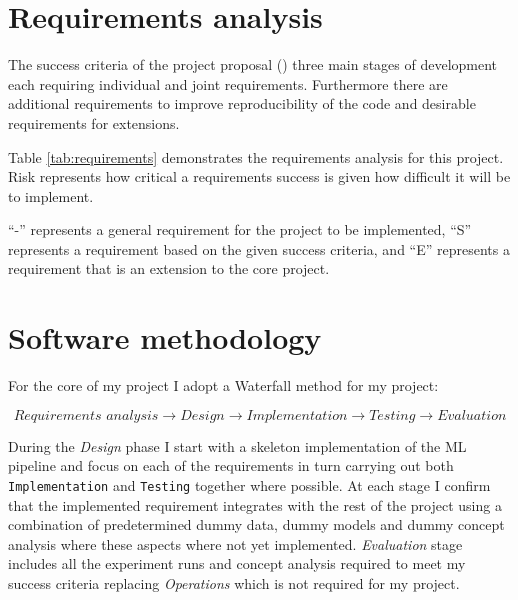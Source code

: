 \section{Requirements analysis}


The success criteria of the project proposal () three main stages of development each requiring individual and joint requirements.
Furthermore there are additional requirements to improve reproducibility of the code and desirable requirements for extensions.

Table \ref{tab:requirements} demonstrates the requirements analysis for this project.
Risk represents how critical a requirements success is given how difficult it will be to implement.

``-'' represents a general requirement for the project to be implemented, ``S'' represents a requirement based on the given success criteria, and ``E'' represents a requirement that is an extension to the core project.



\section{Software methodology}


For the core of my project I adopt a Waterfall method \cite{royce1970managing} for my project:

\begin{equation*}
    \textit{Requirements analysis} \longrightarrow \textit{Design} \longrightarrow \textit{Implementation} \longrightarrow \textit{Testing} \longrightarrow \textit{Evaluation}
\end{equation*}

During the \textit{Design} phase I start with a skeleton implementation of the ML pipeline and focus on each of the requirements in turn carrying out both \texttt{Implementation} and \texttt{Testing} together where possible.
At each stage I confirm that the implemented requirement integrates with the rest of the project using a combination of predetermined dummy data, dummy models and dummy concept analysis where these aspects where not yet implemented.
\textit{Evaluation} stage includes all the experiment runs and concept analysis required to meet my success criteria replacing \textit{Operations} which is not required for my project.


